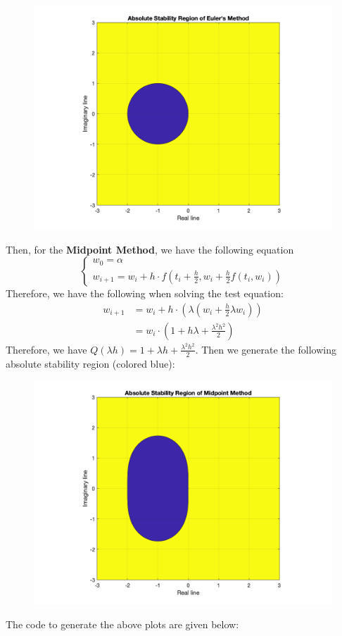 \documentclass[11pt]{article}
\begin{document}
\begin{figure}[H]
\centering
\includegraphics[width = 0.8\linewidth]{abs_eul.png}
\end{figure}\pagebreak
Then, for the \textbf{Midpoint Method}, we have the following equation
\[ \begin{cases}
w_0 = \alpha\\
w_{i+1} = w_i + h\cdot f(t_i + \frac{h}{2}, w_i + \frac{h}{2} f(t_i,w_i))
\end{cases} \]
Therefore, we have the following when solving the test equation:
\begin{align*}
	w_{i+1} &= w_i + h\cdot \left( \lambda \left( w_i + \frac{h}{2} \lambda w_i \right) \right)\\
	&= w_i \cdot \left( 1 + h\lambda + \frac{\lambda^2 h^2}{2} \right)
\end{align*}
Therefore, we have $ \displaystyle Q(\lambda h) = 1 + \lambda h + \frac{\lambda^2 h^2}{2} $. Then we generate the following absolute stability region (colored blue):

\begin{figure}[H]
\centering
\includegraphics[width = 0.8\linewidth]{abs_mid.png}
\end{figure}
The code to generate the above plots are given below:
\pagebreak
\end{document}
